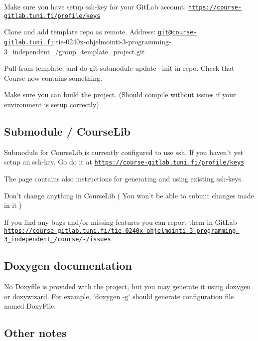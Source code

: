 
\begin{DoxyEnumerate}
\item Make sure you have setup ssh-\/key for your Git\-Lab account. \href{https://course-gitlab.tuni.fi/profile/keys}{\tt https\-://course-\/gitlab.\-tuni.\-fi/profile/keys}
\item Clone and add template repo as remote. Address\-: \href{mailto:git@course-gitlab.tuni.fi}{\tt git@course-\/gitlab.\-tuni.\-fi}\-:tie-\/0240x-\/ohjelmointi-\/3-\/programming-\/3\-\_\-independent\-\_/group\-\_\-template\-\_\-project.\-git
\item Pull from template, and do git submodule update --init in repo. Check that Course now contains something.
\item Make sure you can build the project. (Should compile without issues if your environment is setup correctly)
\end{DoxyEnumerate}

\subsection*{Submodule / Course\-Lib}

Submodule for Course\-Lib is currently configured to use ssh. If you haven't yet setup an ssh-\/key. Go do it at \href{https://course-gitlab.tuni.fi/profile/keys}{\tt https\-://course-\/gitlab.\-tuni.\-fi/profile/keys}

The page contains also instructions for generating and using existing ssh-\/keys.

Don't change anything in Course\-Lib ( You won't be able to submit changes made in it )

If you find any bugs and/or missing features you can report them in Git\-Lab \href{https://course-gitlab.tuni.fi/tie-0240x-ohjelmointi-3-programming-3_independent_2021/course/-/issues}{\tt https\-://course-\/gitlab.\-tuni.\-fi/tie-\/0240x-\/ohjelmointi-\/3-\/programming-\/3\-\_\-independent\-\_/course/-\//issues}

\subsection*{Doxygen documentation}

No Doxyfile is provided with the project, but you may generate it using doxygen or doxywizard. For example, \char`\"{}doxygen -\/g\char`\"{} should generate configuration file named Doxy\-File.

\subsection*{Other notes}

